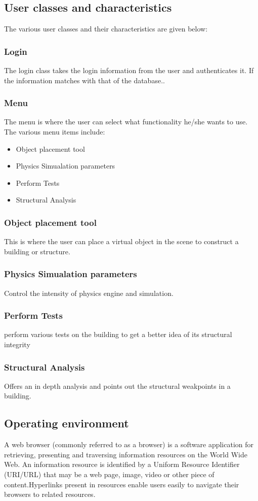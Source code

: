\documentclass[BTech]{srmuthesis}
\begin{document}
\subsection{User classes and characteristics}
The various user classes and their characteristics are given below:

\subsubsection{Login}
The login class takes the login information from the user and authenticates it. If the information matches with that of the database..                          
\subsubsection{Menu}
The menu is where the user can select what functionality he/she wants to use. The various menu items include:
\begin{itemize}
\item Object placement tool
\item Physics Simualation parameters
\item Perform Tests
\item Structural Analysis
\end{itemize}

\subsubsection{Object placement tool}
This is where the user can place a virtual object in the scene to construct a building or structure.
\subsubsection{Physics Simualation parameters}
Control the intensity of physics engine and simulation.  
\subsubsection{Perform Tests}
perform various tests on the building to get a better idea of its structural integrity
\subsubsection{Structural Analysis}
Offers an in depth analysis and points out the structural weakpoints in a building.
\subsection{Operating environment}
A web browser (commonly referred to as a browser) is a software application for retrieving, presenting and traversing information resources on the World Wide Web. An information resource is identified by a Uniform Resource Identifier (URI/URL) that may be a web page, image, video or other piece of content.Hyperlinks present in resources enable users easily to navigate their browsers to related resources.
\end{document}
